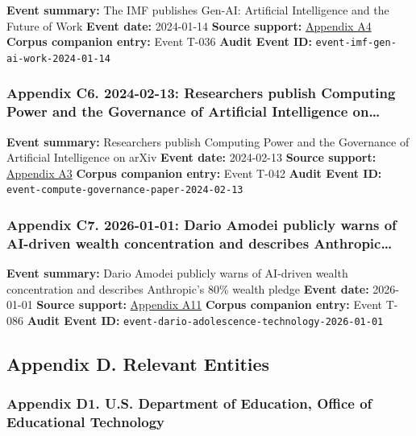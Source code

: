 \documentclass[
  american,
  11pt,
  letterpaper,
]{article}
\begin{document}
\textbf{Event summary:} The IMF publishes Gen-AI: Artificial
Intelligence and the Future of Work \textbf{Event date:} 2024-01-14
\textbf{Source support:}
\hyperref[ch-09-appendix-a4-gen-ai-artificial-intelligence-and-the-future-of-work]{Appendix
A4} \textbf{Corpus companion entry:} Event T-036 \textbf{Audit Event
ID:} \texttt{event-imf-gen-ai-work-2024-01-14}

\subsubsection{Appendix C6. 2024-02-13: Researchers publish Computing
Power and the Governance of Artificial Intelligence
on\ldots{}}\label{ch-09-appendix-c6-2024-02-13-researchers-publish-computing-power-and-the-governance-of-artificial-intelligence-on-arxiv}

\textbf{Event summary:} Researchers publish Computing Power and the
Governance of Artificial Intelligence on arXiv \textbf{Event date:}
2024-02-13 \textbf{Source support:}
\hyperref[ch-09-appendix-a3-computing-power-and-the-governance-of-artificial-intelligence]{Appendix
A3} \textbf{Corpus companion entry:} Event T-042 \textbf{Audit Event
ID:} \texttt{event-compute-governance-paper-2024-02-13}

\subsubsection{Appendix C7. 2026-01-01: Dario Amodei publicly warns of
AI-driven wealth concentration and describes
Anthropic\ldots{}}\label{ch-09-appendix-c7-2026-01-01-dario-amodei-publicly-warns-of-ai-driven-wealth-concentration-and-describes-anthropic-s-80-wealth-pledge}

\textbf{Event summary:} Dario Amodei publicly warns of AI-driven wealth
concentration and describes Anthropic's 80\% wealth pledge \textbf{Event
date:} 2026-01-01 \textbf{Source support:}
\hyperref[ch-09-appendix-a11-the-adolescence-of-technology]{Appendix
A11} \textbf{Corpus companion entry:} Event T-086 \textbf{Audit Event
ID:} \texttt{event-dario-adolescence-technology-2026-01-01}

\subsection{Appendix D. Relevant
Entities}\label{appendix-d.-relevant-entities-9}

\subsubsection{Appendix D1. U.S. Department of Education, Office of
Educational
Technology}\label{ch-09-appendix-d1-u-s-department-of-education-office-of-educational-technology}
\end{document}
